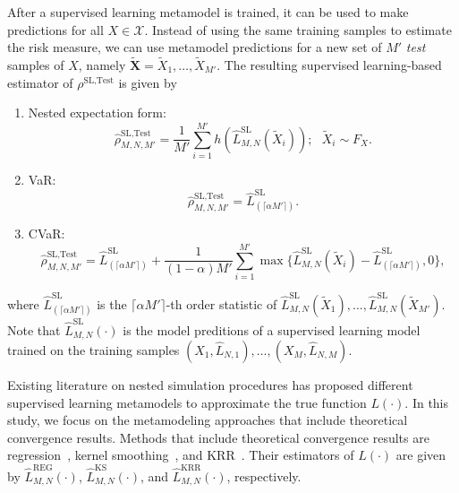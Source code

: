 After a supervised learning metamodel is trained, it can be used to make predictions for all $X \in \mathcal{X}$.
Instead of using the same training samples to estimate the risk measure, we can use metamodel predictions for a new set of $M'$ \textit{test} samples of $X$, namely $\tilde{\mathbf{X}} = \tilde{X}_1, \dots, \tilde{X}_{M'}$.
The resulting supervised learning-based estimator of $\rho^{\text{SL}, \text{Test}}$ is given by

\begin{enumerate}
    \item   Nested expectation form:
            \begin{equation} \label{eq1:sl-test}
            \hat{\rho}^{\text{SL}, \text{Test}}_{M, N, M'} = \frac{1}{M'} \sum_{i=1}^{M'} h(\hat{L}^{\text{SL}}_{M, N}(\tilde{X}_i)); ~~~ \tilde{X}_i \sim F_X.
            \end{equation}
    \item   VaR:
            $$\hat{\rho}^{\text{SL}, \text{Test}}_{M, N, M'} = \hat{L}^{\text{SL}}_{(\lceil \alpha M' \rceil)}.$$
    \item   CVaR:
            \begin{equation*}
                \hat{\rho}^{\text{SL}, \text{Test}}_{M, N, M'} 
                = \hat{L}^{\text{SL}}_{(\lceil \alpha M' \rceil)} 
                + \frac{1}{(1-\alpha) M'} \sum_{i=1}^{M'} \max \{\hat{L}^{\text{SL}}_{M, N}(\tilde{X}_i) - \hat{L}^{\text{SL}}_{(\lceil \alpha M' \rceil)}, 0 \}, 
            \end{equation*}
\end{enumerate}
where $\hat{L}^{\text{SL}}_{(\lceil \alpha M' \rceil)}$ is the $\lceil \alpha M' \rceil$-th order statistic of $\hat{L}^{\text{SL}}_{M, N}(\tilde{X}_1), \dots, \hat{L}^{\text{SL}}_{M, N}(\tilde{X}_{M'})$. 
Note that $\hat{L}^{\text{SL}}_{M, N}(\cdot)$ is the model preditions of a supervised learning model trained on the training samples $(X_1, \hat{L}_{N, 1}), \dots, (X_M, \hat{L}_{N, M})$.

Existing literature on nested simulation procedures has proposed different supervised learning metamodels to approximate the true function $L(\cdot)$.
In this study, we focus on the metamodeling approaches that include theoretical convergence results.
Methods that include theoretical convergence results are regression~\citep{broadie2015risk}, kernel smoothing~\citep{hong2017kernel}, and KRR~\citep{wang2022smooth}.
Their estimators of $L(\cdot)$ are given by $\hat{L}^{\text{REG}}_{M, N}(\cdot)$, $\hat{L}^{\text{KS}}_{M, N}(\cdot)$, and $\hat{L}^{\text{KRR}}_{M, N}(\cdot)$, respectively.

